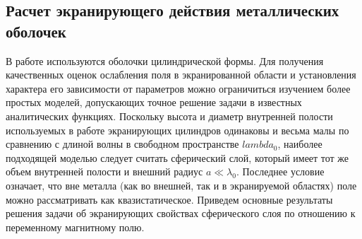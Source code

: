 





\subsection{Расчет экранирующего действия металлических оболочек}

В работе используются оболочки цилиндрической формы. Для получения качественных оценок ослабления поля в экранированной области и установления характера его зависимости от параметров можно ограничиться изучением более простых моделей, допускающих точное решение задачи в известных аналитических функциях. Поскольку высота и диаметр внутренней полости используемых в работе экранирующих цилиндров одинаковы и весьма малы по сравнению с длиной волны в свободном пространстве $lambda_0$, наиболее подходящей моделью следует считать сферический слой, который имеет тот же объем внутренней полости и внешний радиус $a \ll \lambda_0$. Последнее условие означает, что вне металла (как во внешней, так и в экранируемой областях) поле можно рассматривать как квазистатическое. Приведем основные результаты решения задачи об экранирующих свойствах сферического слоя по отношению к переменному магнитному полю. 

